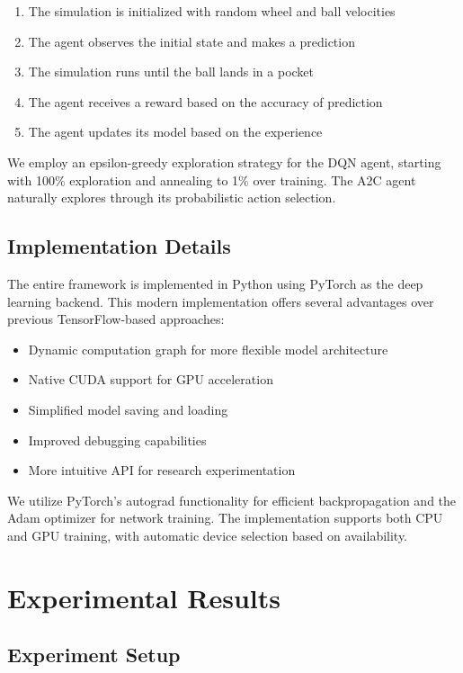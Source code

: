 \documentclass[conference]{IEEEtran}
\begin{document}
\begin{enumerate}
    \item The simulation is initialized with random wheel and ball velocities
    \item The agent observes the initial state and makes a prediction
    \item The simulation runs until the ball lands in a pocket
    \item The agent receives a reward based on the accuracy of prediction
    \item The agent updates its model based on the experience
\end{enumerate}

We employ an epsilon-greedy exploration strategy for the DQN agent, starting with 100\% exploration and annealing to 1\% over training. The A2C agent naturally explores through its probabilistic action selection.

\subsection{Implementation Details}

The entire framework is implemented in Python using PyTorch as the deep learning backend. This modern implementation offers several advantages over previous TensorFlow-based approaches:

\begin{itemize}
    \item Dynamic computation graph for more flexible model architecture
    \item Native CUDA support for GPU acceleration
    \item Simplified model saving and loading
    \item Improved debugging capabilities
    \item More intuitive API for research experimentation
\end{itemize}

We utilize PyTorch's autograd functionality for efficient backpropagation and the Adam optimizer for network training. The implementation supports both CPU and GPU training, with automatic device selection based on availability.

\section{Experimental Results}

\subsection{Experiment Setup}
\end{document}
